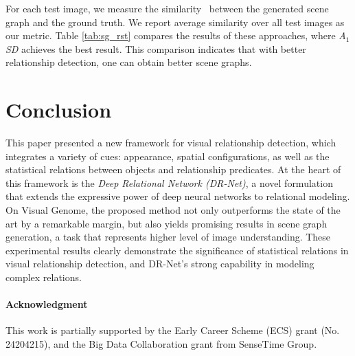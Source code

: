 \documentclass[10pt,twocolumn,letterpaper]{article}
\begin{document}
For each test image, we measure the similarity~\cite{champin2003measuring} between the generated scene graph and the ground truth.
We report average similarity over all test images as our metric.
Table \ref{tab:sg_rst} compares the results of these approaches,
where \emph{A$_1$SD} achieves the best result.
This comparison indicates that
with better relationship detection, one can obtain better scene graphs.

\section{Conclusion}\label{sec:concls}This paper presented a new framework for visual relationship detection,
which integrates a variety of cues: appearance, spatial configurations,
as well as the statistical relations between objects and relationship predicates.
At the heart of this framework is the \emph{Deep Relational Network (DR-Net)},
a novel formulation that extends the expressive power of deep neural networks
to relational modeling.
On Visual Genome, the proposed method not only outperforms the state of the art
by a remarkable margin,
but also yields promising results in scene graph generation, a task that
represents higher level of image understanding.
These experimental results clearly demonstrate the significance of
statistical relations in visual relationship detection,
and DR-Net's strong capability in modeling complex relations.

\vspace{-10pt}\paragraph{Acknowledgment}

This work is partially supported by
the Early Career Scheme (ECS) grant (No. 24204215), and
the Big Data Collaboration grant from SenseTime Group.


{\small


}
\end{document}
